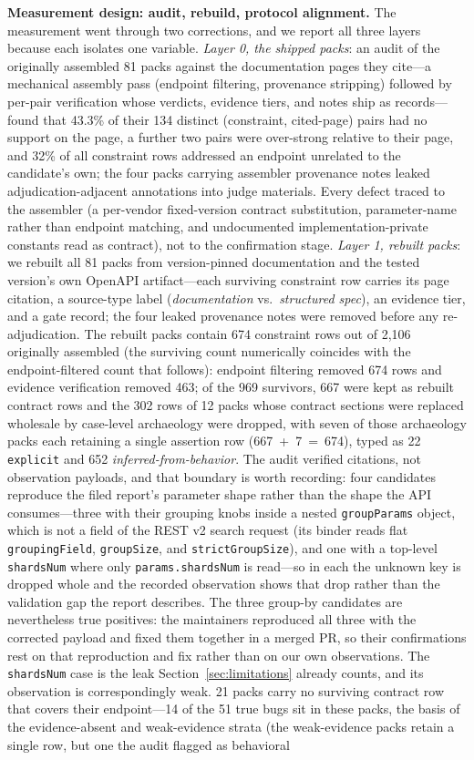 \documentclass[acmsmall,screen,review,anonymous]{acmart}
\begin{document}
\textbf{Measurement design: audit, rebuild, protocol alignment.}
The measurement went through two corrections, and we report all three layers because each isolates one variable. \emph{Layer 0, the shipped packs}: an audit of the originally assembled 81 packs against the documentation pages they cite---a mechanical assembly pass (endpoint filtering, provenance stripping) followed by per-pair verification whose verdicts, evidence tiers, and notes ship as records---found that 43.3\% of their 134 distinct (constraint, cited-page) pairs had no support on the page, a further two pairs were over-strong relative to their page, and 32\% of all constraint rows addressed an endpoint unrelated to the candidate's own; the four packs carrying assembler provenance notes leaked adjudication-adjacent annotations into judge materials. Every defect traced to the assembler (a per-vendor fixed-version contract substitution, parameter-name rather than endpoint matching, and undocumented implementation-private constants read as contract), not to the confirmation stage. \emph{Layer 1, rebuilt packs}: we rebuilt all 81 packs from version-pinned documentation and the tested version's own OpenAPI artifact---each surviving constraint row carries its page citation, a source-type label (\emph{documentation} vs.\ \emph{structured spec}), an evidence tier, and a gate record; the four leaked provenance notes were removed before any re-adjudication. The rebuilt packs contain 674 constraint rows out of 2{,}106 originally assembled (the surviving count numerically coincides with the endpoint-filtered count that follows): endpoint filtering removed 674 rows and evidence verification removed 463; of the 969 survivors, 667 were kept as rebuilt contract rows and the 302 rows of 12 packs whose contract sections were replaced wholesale by case-level archaeology were dropped, with seven of those archaeology packs each retaining a single assertion row (667~+~7~=~674), typed as 22 \texttt{explicit} and 652 \emph{inferred-from-behavior}. The audit verified citations, not observation payloads, and that boundary is worth recording: four candidates reproduce the filed report's parameter shape rather than the shape the API consumes---three with their grouping knobs inside a nested \texttt{groupParams} object, which is not a field of the REST v2 search request (its binder reads flat \texttt{groupingField}, \texttt{groupSize}, and \texttt{strictGroupSize}), and one with a top-level \texttt{shardsNum} where only \texttt{params.shardsNum} is read---so in each the unknown key is dropped whole and the recorded observation shows that drop rather than the validation gap the report describes. The three group-by candidates are nevertheless true positives: the maintainers reproduced all three with the corrected payload and fixed them together in a merged PR, so their confirmations rest on that reproduction and fix rather than on our own observations. The \texttt{shardsNum} case is the leak Section~\ref{sec:limitations} already counts, and its observation is correspondingly weak. 21 packs carry no surviving contract row that covers their endpoint---14 of the 51 true bugs sit in these packs, the basis of the evidence-absent and weak-evidence strata (the weak-evidence packs retain a single row, but one the audit flagged as behavioral 
\end{document}

